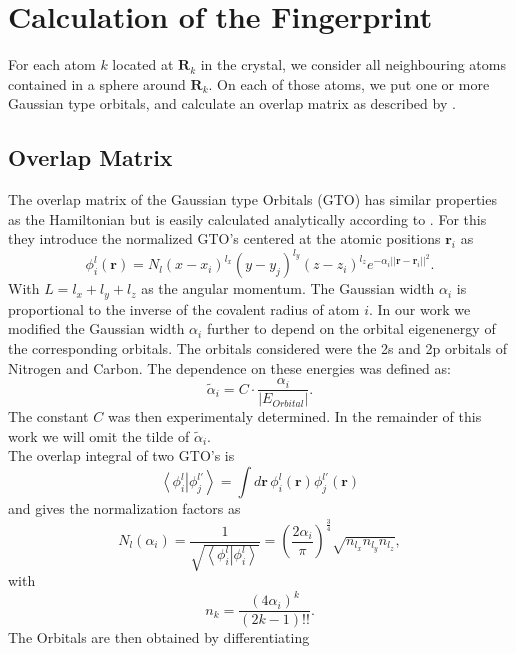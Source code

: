 \section{Calculation of the Fingerprint}
For each atom $k$ located at $\mathbf{R}_k$ in the crystal, we consider all neighbouring atoms contained in a sphere around $\mathbf{R}_k$. On each of those atoms, we put one or more Gaussian type orbitals, and calculate an overlap matrix as described by \citeauthor{Sadeghi2013} \cite{Sadeghi2013}.
\subsection{Overlap Matrix}
The overlap matrix of the Gaussian type Orbitals (GTO) has similar properties as the Hamiltonian but is easily calculated analytically according to \citeauthor{Sadeghi2013} \cite{Sadeghi2013}. For this they introduce the normalized GTO's centered at the atomic positions $\mathbf{r}_i$ as
\begin{equation}\phi_i^l(\mathbf{r})=N_l(x-x_i)^{l_x}(y-y_j)^{l_y}(z-z_i)^{l_z}e^{-\alpha_i||\mathbf{r}-\mathbf{r}_i||^2}.\end{equation}
With $L=l_x+l_y+l_z$ as the angular momentum. The Gaussian width $\alpha_i$ is proportional to the inverse of the covalent radius of atom $i$. In our work we modified the Gaussian width $\alpha_i$ further to depend on the orbital eigenenergy of the corresponding orbitals. The orbitals considered were the 2s and 2p orbitals of Nitrogen and Carbon. The dependence on these energies was defined as:
\begin{equation}\label{eq:const}\tilde{\alpha}_i=C\cdot\frac{\alpha_i}{\left|E_{Orbital}\right|}.\end{equation} 
The constant $C$ was then experimentaly determined. In the remainder of this work we will omit the tilde of $\tilde{\alpha}_i$.\\
The overlap integral of two GTO's is
\begin{equation}\left<\phi_i^l\right|\left.\phi_j^{l'}\right>=\int d\mathbf{r}\,\phi_i^l(\mathbf{r})\phi^{l'}_j(\mathbf{r})\end{equation}
and gives the normalization factors as
\begin{equation}N_l(\alpha_i)=\frac{1}{\sqrt{\left<\phi_i^l\right|\left.\phi_i^l\right>}}=\left(\frac{2\alpha_i}{\pi}\right)^{\frac{3}{4}}\sqrt{n_{l_x}n_{l_y}n_{l_z}},\end{equation}
with
$$n_k=\frac{(4\alpha_i)^k}{(2k-1)!!}.$$
The Orbitals are then obtained by differentiating
